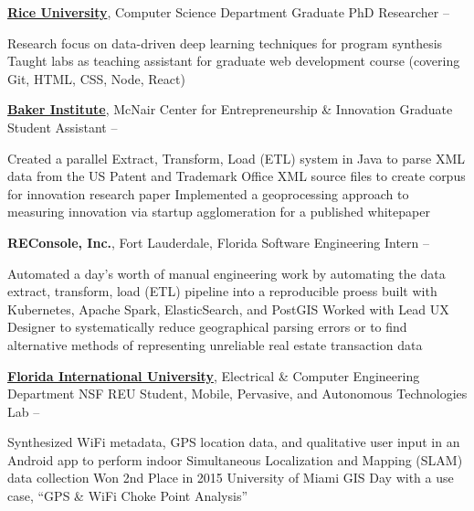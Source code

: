 \documentclass[letterpaper,MMMyyyy,nonstopmode]{simpleresumecv}
\begin{document}
\begin{Body}
\Entry
\href{http://www.rice.edu/}{\textbf{Rice University}}, Computer Science Department
\Gap
\BulletItem Graduate PhD Researcher
\hfill {} -- 
\begin{Detail}
\SubBulletItem Research focus on data-driven deep learning techniques for program synthesis
\SubBulletItem Taught labs as teaching assistant for graduate web development course (covering Git, HTML, CSS, Node, React)
\end{Detail}

\Entry
\href{http://www.rice.edu/}{\textbf{Baker Institute}}, McNair Center for Entrepreneurship \& Innovation
\Gap
\BulletItem Graduate Student Assistant
\hfill {} -- 
\begin{Detail}
\SubBulletItem Created a parallel Extract, Transform, Load (ETL) system in Java to parse XML data from the US Patent and Trademark Office XML source files to create corpus for innovation research paper
\SubBulletItem Implemented a geoprocessing approach to measuring innovation via startup agglomeration for a published whitepaper
\end{Detail}

\Entry
\textbf{REConsole, Inc.}, Fort Lauderdale, Florida
\Gap
\BulletItem
Software Engineering Intern
\hfill
{} -- 
\begin{Detail}
\SubBulletItem Automated a day's worth of manual engineering work by automating the data extract, transform, load (ETL) pipeline into a reproducible proess built with Kubernetes, Apache Spark, ElasticSearch, and PostGIS
\SubBulletItem Worked with Lead UX Designer to systematically reduce geographical parsing errors or to find alternative methods of representing unreliable real estate transaction data
\end{Detail}

\Entry
\href{http://www.fiu.edu/}{\textbf{Florida International University}}, Electrical \& Computer Engineering Department
\Gap
\BulletItem NSF REU Student, Mobile, Pervasive, and Autonomous Technologies Lab
\hfill {} -- 
\begin{Detail}
\SubBulletItem Synthesized WiFi metadata, GPS location data, and qualitative user input in an Android app to perform indoor Simultaneous Localization and Mapping (SLAM) data collection
\SubBulletItem Won 2nd Place in 2015 University of Miami GIS Day with a use case, ``GPS \& WiFi Choke Point Analysis''
\end{Detail}


\end{Body}
\end{document}
